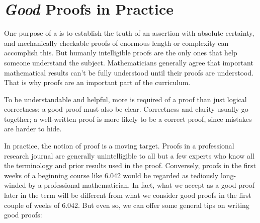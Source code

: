 \section{\textit{Good} Proofs in Practice}

One purpose of a  is to establish the truth of an assertion with
absolute certainty, and mechanically checkable proofs of enormous length or
complexity can accomplish this.  But humanly intelligible proofs are the
only ones that help someone understand the subject.  Mathematicians
generally agree that important mathematical results can't be fully
understood until their proofs are understood.  That is why proofs are an
important part of the curriculum.

To be understandable and helpful, more is required of a proof than just
logical correctness: a good proof must also be clear.  Correctness and
clarity usually go together; a well-written proof is more likely to be a
correct proof, since mistakes are harder to hide.

In practice, the notion of proof is a moving target.  Proofs in a
professional research journal are generally unintelligible to all but a
few experts who know all the terminology and prior results used in the
proof.  Conversely, proofs in the first weeks of a beginning course like
6.042 would be regarded as tediously long-winded by a professional
mathematician.  In fact, what we accept as a good proof later in the term
will be different from what we consider good proofs in the first couple of
weeks of 6.042.  But even so, we can offer some general tips on writing
good proofs:

